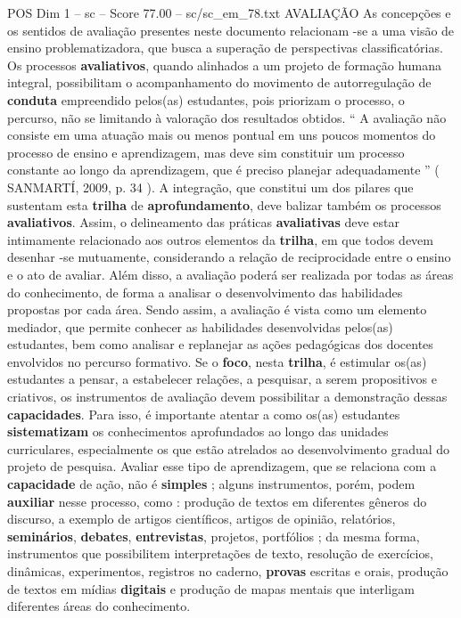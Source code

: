 \begin{textsample}{POS Dim 1 – sc – Score 77.00 – sc/sc\_em\_78.txt}
AVALIAÇÃO As concepções e os sentidos de avaliação presentes neste documento relacionam -se a uma visão de ensino problematizadora, que busca a superação de perspectivas classificatórias.
Os processos \textbf{avaliativos}, quando alinhados a um projeto de formação humana integral, possibilitam o acompanhamento do movimento de autorregulação de \textbf{conduta} empreendido pelos(as) estudantes, pois priorizam o processo, o percurso, não se limitando à valoração dos resultados obtidos. “ A avaliação não consiste em uma atuação mais ou menos pontual em uns poucos momentos do processo de ensino e aprendizagem, mas deve sim constituir um processo constante ao longo da aprendizagem, que é preciso planejar adequadamente ” ( SANMARTÍ, 2009, p. 34 ).
A integração, que constitui um dos pilares que sustentam esta \textbf{trilha} de \textbf{aprofundamento}, deve balizar também os processos \textbf{avaliativos}.
Assim, o delineamento das práticas \textbf{avaliativas} deve estar intimamente relacionado aos outros elementos da \textbf{trilha}, em que todos devem desenhar -se mutuamente, considerando a relação de reciprocidade entre o ensino e o ato de avaliar.
Além disso, a avaliação poderá ser realizada por todas as áreas do conhecimento, de forma a analisar o desenvolvimento das habilidades propostas por cada área.
Sendo assim, a avaliação é vista como um elemento mediador, que permite conhecer as habilidades desenvolvidas pelos(as) estudantes, bem como analisar e replanejar as ações pedagógicas dos docentes envolvidos no percurso formativo.
Se o \textbf{foco}, nesta \textbf{trilha}, é estimular os(as) estudantes a pensar, a estabelecer relações, a pesquisar, a serem propositivos e criativos, os instrumentos de avaliação devem possibilitar a demonstração dessas \textbf{capacidades}.
Para isso, é importante atentar a como os(as) estudantes \textbf{sistematizam} os conhecimentos aprofundados ao longo das unidades curriculares, especialmente os que estão atrelados ao desenvolvimento gradual do projeto de pesquisa.
Avaliar esse tipo de aprendizagem, que se relaciona com a \textbf{capacidade} de ação, não é \textbf{simples} ; alguns instrumentos, porém, podem \textbf{auxiliar} nesse processo, como : produção de textos em diferentes gêneros do discurso, a exemplo de artigos científicos, artigos de opinião, relatórios, \textbf{seminários}, \textbf{debates}, \textbf{entrevistas}, projetos, portfólios ; da mesma forma, instrumentos que possibilitem interpretações de texto, resolução de exercícios, dinâmicas, experimentos, registros no caderno, \textbf{provas} escritas e orais, produção de textos em mídias \textbf{digitais} e produção de mapas mentais que interligam diferentes áreas do conhecimento.

\end{textsample}
